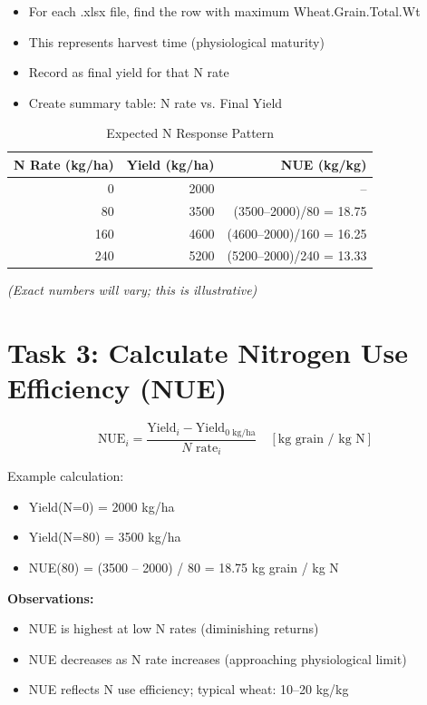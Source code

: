 \begin{itemize}
  \item For each .xlsx file, find the row with maximum Wheat.Grain.Total.Wt
  \item This represents harvest time (physiological maturity)
  \item Record as final yield for that N rate
  \item Create summary table: N rate vs. Final Yield
\end{itemize}

\begin{table}[H]
\centering
\caption{Expected N Response Pattern}
\label{tab:n-response}
\begin{tabularx}{\textwidth}{r|r|r}
\toprule
\textbf{N Rate (kg/ha)} & \textbf{Yield (kg/ha)} & \textbf{NUE (kg/kg)} \\
\midrule
0 & 2000 & -- \\
80 & 3500 & (3500--2000)/80 = 18.75 \\
160 & 4600 & (4600--2000)/160 = 16.25 \\
240 & 5200 & (5200--2000)/240 = 13.33 \\
\bottomrule
\end{tabularx}
\end{table}

\textit{(Exact numbers will vary; this is illustrative)}

\section{Task 3: Calculate Nitrogen Use Efficiency (NUE)}

\[
\text{NUE}_{i} = \frac{\text{Yield}_{i} - \text{Yield}_{0 \text{ kg/ha}}}{N \text{ rate}_{i}} \quad [\text{kg grain / kg N}]
\]

Example calculation:
\begin{itemize}
  \item Yield(N=0) = 2000 kg/ha
  \item Yield(N=80) = 3500 kg/ha
  \item NUE(80) = (3500 -- 2000) / 80 = 18.75 kg grain / kg N
\end{itemize}

\textbf{Observations:}
\begin{itemize}
  \item NUE is highest at low N rates (diminishing returns)
  \item NUE decreases as N rate increases (approaching physiological limit)
  \item NUE reflects N use efficiency; typical wheat: 10--20 kg/kg
\end{itemize}

